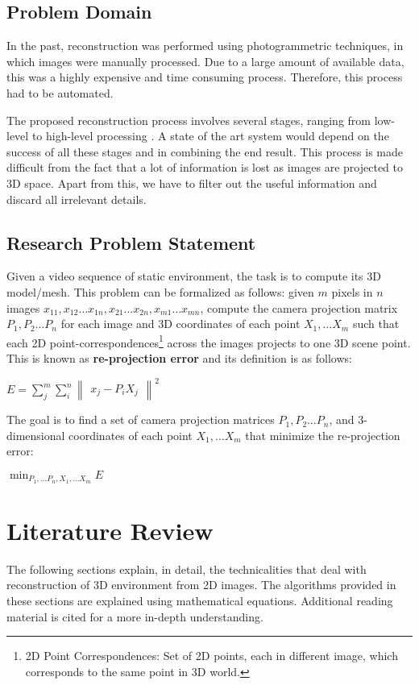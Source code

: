 \documentclass[11pt, a4paper, openany]{article}
\begin{document}
\subsection{Problem Domain} In the past, reconstruction was performed using photogrammetric techniques, in which images were manually processed. Due to a large amount of available data, this was a highly expensive and time consuming process. Therefore, this process had to be automated.

The proposed reconstruction process involves several stages, ranging from low-level to high-level processing \cite{reconstruction steps}. A state of the art system would depend on the success of all these stages and in combining the end result. This process is made difficult from the fact that a lot of information is lost as images are projected to 3D space. Apart from this, we have to filter out the useful information and discard all irrelevant details.

\subsection{Research Problem Statement} Given a video sequence of static environment, the task is to compute its 3D model/mesh. This problem can be formalized as follows:
given $m$ pixels in $n$ images $x_{11}, x_{12}\ldots x_{1n}, x_{21}\ldots x_{2n}, x_{m1}\ldots x_{mn}$, compute the camera projection matrix $P_{1}, P_{2}\ldots P_{n}$ for each image and 3D coordinates of each point $X_{1}, \dots X_{m}$ such that each 2D point-correspondences\footnote{2D Point Correspondences: Set of 2D points, each in different image, which corresponds to the same point in 3D world.} across the images projects to one 3D scene point. This is known as \textbf{re-projection error} and its definition is as follows:

\begin{center} $E = \sum_{j}^{m} \sum_{i}^{n}\begin{Vmatrix}
x_{j} - P_{i}X_{j}
\end{Vmatrix}^{2}$ \end{center}

The goal is to find a set of camera projection matrices $P_{1}, P_{2}\ldots P_{n}$, and 3-dimensional coordinates of each point $X_{1}, \dots X_{m}$ that minimize the re-projection error:
\begin{center} $\min_{P_{1},\dots P_{n}, X_{1},\ldots X_{m}} E$ \end{center}


\section{Literature Review}
The following sections explain, in detail, the technicalities that deal with reconstruction of 3D environment from 2D images. The algorithms provided in these sections are explained using mathematical equations. Additional reading material is cited for a more in-depth understanding.
\end{document}
